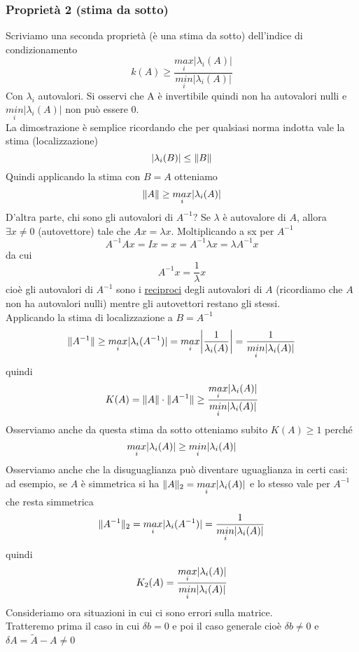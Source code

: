 \subsubsection{Proprietà 2 (stima da sotto)}
Scriviamo una seconda proprietà (è una stima da sotto) dell'indice di condizionamento
\begin{equation*}
    k(A)\geq\frac{\underset{i}{max}|\lambda_i(A)|}{\underset{i}{min}|\lambda_i(A)|}
\end{equation*}
Con $\lambda_i$ autovalori. Si osservi che A è invertibile quindi non ha autovalori nulli e $\underset{i}{min}|\lambda_i(A)|$ non può essere 0.\\La dimostrazione è semplice ricordando che per qualsiasi norma indotta vale la stima (localizzazione)
\begin{equation*}
    |\lambda_i(B)|\leq\lVert B\rVert
\end{equation*}
Quindi applicando la stima con $B=A$ otteniamo
\begin{equation*}
    \lVert A\rVert\geq\underset{i}{max}|\lambda_i(A)|
\end{equation*}
D'altra parte, chi sono gli autovalori di $A^{-1}$? Se $\lambda$ è autovalore di $A$, allora $\exists x \neq 0$ (autovettore) tale che $Ax=\lambda x$. Moltiplicando a sx per $A^{-1}$
\begin{equation*}
    A^{-1}Ax=Ix=x=A^{-1}\lambda x=\lambda A^{-1}x
\end{equation*}
da cui
\begin{equation*}
    A^{-1}x=\frac{1}{\lambda}x
\end{equation*}
cioè gli autovalori di $A^{-1}$ sono i \uline{reciproci} degli autovalori di $A$ (ricordiamo che $A$ non ha autovalori nulli) mentre gli autovettori restano gli stessi.\\
Applicando la stima di localizzazione a $B = A^{-1}$
\[
\norma{A^{-1}} \ge \underset{i}{max} \abs{\lambda_i (A^{-1})} = \underset{i}{max} \abs*{\frac{1}{\lambda_i (A)}} = \frac{1}{\underset{i}{min} \abs{\lambda_i(A)}}
\]
quindi
\[
K(A) = \lVert A\rVert \cdot \lVert A^{-1}\rVert \ge \frac{\underset{i}{max} \lvert\lambda_i (A)\rvert}{\underset{i}{min} \lvert\lambda_i (A)\rvert}
\]
Osserviamo anche da questa stima da sotto otteniamo subito $K(A) \ge 1$ perché
\[
\underset{i}{max} \lvert\lambda_i(A)\rvert \ge \underset{i}{min} \lvert\lambda_i(A)\rvert
\]
Osserviamo anche che la disuguaglianza può diventare uguaglianza in certi casi: ad esempio, se $A$ è simmetrica si ha $\lVert A\rVert_2 = \underset{i}{max} \lvert\lambda_i (A)\rvert$ e lo stesso vale per $A^{-1}$ che resta simmetrica
\[
\lVert A^{-1}\rVert_2 = \underset{i}{max} \lvert\lambda_i (A^{-1})\rvert = \frac{1}{\underset{i}{min} \lvert\lambda_i(A)\rvert}
\]
quindi
\[
K_2 (A) = \frac{\underset{i}{max} \lvert\lambda_i (A)\rvert}{\underset{i}{min} \lvert\lambda_i (A)\rvert}
\]
Consideriamo ora situazioni in cui ci sono errori sulla matrice.\\
Tratteremo prima il caso in cui $\delta b = 0$ e poi il caso generale cioè $\delta b \neq 0$ e $\delta A = \tilde{A} - A \neq 0$

